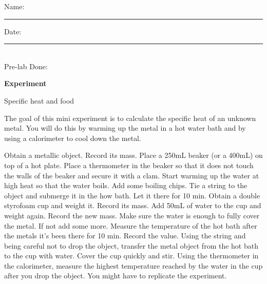\documentclass[main.tex]{subfiles}
\begin{document}
\clearpage\mbox{}\clearpage



\begin{multicols}{2}
\begin{tcolorbox}[enhanced jigsaw,breakable,size=title,
colback=mybrown!05,colframe=black,fonttitle=\bfseries,
title=STUDENT INFO,pad at break=1mm, break at=15cm/0pt ]
\vspace{0.2cm}
\noindent Name: \rule{5cm}{0.4pt}Date:\rule{1cm}{0.4pt}\\
Pre-lab Done: \quad
\end{tcolorbox}
\end{multicols}
\hfill
\vspace{0.2cm}
\begin{center}
{\large \bfseries 
Experiment
\par
\Huge
Specific heat and food
\\[5pt] \par}
\vspace{0.2cm}
\end{center}
\par
\noindent
\uline{  \hfill \normalsize \hfill       }

\vspace{0.2cm}{\large \bfseries 1. Specific heat of a metal}
The goal of this mini experiment is to calculate the specific heat of an unknown metal. You will do this by warming up the metal in a hot water bath and by using a calorimeter to cool down the metal.
\begin{steps}
    \newstep[] Obtain a metallic object. Record its mass. 
    \newstep[] Place a 250mL beaker (or a 400mL) on top of a hot plate. Place a thermometer in the beaker so that it does not touch the walls of the beaker and secure it with a clam. Start warming up the water at high heat so that the water boils. Add some boiling chips.
    \newstep[] Tie a string to the object and submerge it in the how bath. Let it there for 10 min.
    \newstep[] Obtain a double styrofoam cup and weight it. Record its mass.
    \newstep[] Add 50mL of water to the cup and weight again. Record the new mass. Make sure the water is enough to fully cover the metal. If not add some more.
    \newstep[] Measure the temperature of the hot bath after the metals it's been there for 10 min. Record the value.
    \newstep[] Using the string and being careful not to drop the object, transfer the metal object from the hot bath to the cup with water. Cover the cup quickly and stir.
    \newstep[] Using the thermometer in the calorimeter, measure the highest temperature reached by the water in the cup after you drop the object.
    \newstep[] You might have to replicate the experiment.

\end{steps}
 
\end{document}

